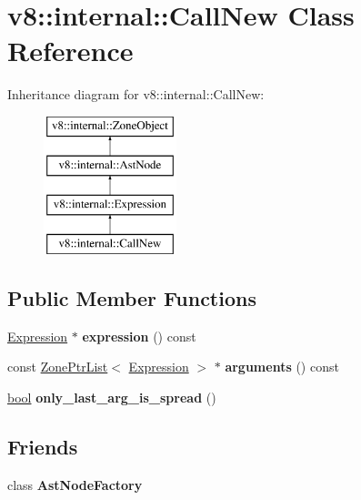 \hypertarget{classv8_1_1internal_1_1CallNew}{}\section{v8\+:\+:internal\+:\+:Call\+New Class Reference}
\label{classv8_1_1internal_1_1CallNew}
Inheritance diagram for v8\+:\+:internal\+:\+:Call\+New\+:\begin{figure}[H]
\begin{center}
\leavevmode
\includegraphics[height=4.000000cm]{classv8_1_1internal_1_1CallNew}
\end{center}
\end{figure}
\subsection*{Public Member Functions}
\begin{DoxyCompactItemize}
\item 
\mbox{\label{classv8_1_1internal_1_1CallNew_a77a73bfb9929339f91b13666f84b892b}} 
\mbox{\hyperlink{classv8_1_1internal_1_1Expression}{Expression}} $\ast$ {\bfseries expression} () const
\item 
\mbox{\label{classv8_1_1internal_1_1CallNew_a579a25522854fc1b04e145eb24590f8a}} 
const \mbox{\hyperlink{classv8_1_1internal_1_1ZoneList}{Zone\+Ptr\+List}}$<$ \mbox{\hyperlink{classv8_1_1internal_1_1Expression}{Expression}} $>$ $\ast$ {\bfseries arguments} () const
\item 
\mbox{\label{classv8_1_1internal_1_1CallNew_a03d65e63a9fbc67e46d9f51ad0f1144a}} 
\mbox{\hyperlink{classbool}{bool}} {\bfseries only\+\_\+last\+\_\+arg\+\_\+is\+\_\+spread} ()
\end{DoxyCompactItemize}
\subsection*{Friends}
\begin{DoxyCompactItemize}
\item 
\mbox{\label{classv8_1_1internal_1_1CallNew_a8d587c8ad3515ff6433eb83c578e795f}} 
class {\bfseries Ast\+Node\+Factory}
\end{DoxyCompactItemize}
